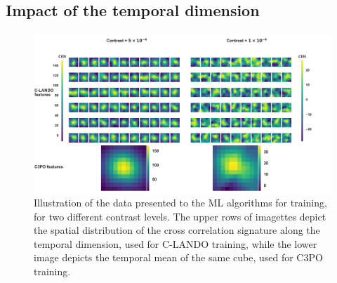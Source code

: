 \documentclass{aa}
\begin{document}
\subsection{Impact of the temporal dimension}

\begin{figure}
\centering
\includegraphics[width=\textwidth]{fig5_disc_dec2023_cropped.png}
\caption{Illustration of the data presented to the ML algorithms for training, for two different contrast levels. The upper rows of imagettes depict the spatial distribution of the cross correlation signature along the temporal dimension, used for C-LANDO training, while the lower image depicts the temporal mean of the same cube, used for C3PO training. }
\label{fig:disc-part1}
\end{figure}
\end{document}
